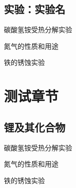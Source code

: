 \documentclass[color=orange]{textbook-cn}%
\begin{document}
\section{实验：实验名}
\begin{Point}
\lipsum[2]
\end{Point}

\begin{Case}
\item 碳酸氢铵受热分解实验
\item 氮气的性质和用途
\item 铁的锈蚀实验
\end{Case}


\begin{Corollary*}[推论名称]
\lipsum[2][1-7]
\end{Corollary*}



\chapter*{测试章节}
\lipsum\lipsum




\section{锂及其化合物}

\begin{Point}
\lipsum[2]
\end{Point}

\begin{Case}
\item 碳酸氢铵受热分解实验
\item 氮气的性质和用途
\item 铁的锈蚀实验
\end{Case}
\end{document}
